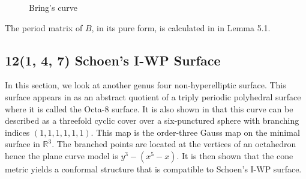 \documentclass[12pt,reqno]{amsart}
\theoremstyle{definition}
\theoremstyle{remark}
\begin{document}
\begin{figure}[htbp]
    \centering
    \qquad
   \qquad
    \caption{Bring's curve}%
    \label{fig:1331}%
\end{figure}



The period matrix of $B$, in its pure form, is calculated in \cite{matti} in Lemma 5.1. %


\subsection{12(1, 4, 7) Schoen's I-WP Surface}


In this section, we look at another genus four non-hyperelliptic surface. This surface appears in \cite{dthesis} as an abstract quotient of a triply periodic polyhedral surface where it is called the Octa-8 surface. It is also shown in \cite{dthesis} that this curve can be described as a threefold cyclic cover over a six-punctured sphere with branching indices $(1, 1, 1, 1, 1, 1).$ This map is the order-three Gauss map on the minimal surface in $\mathbb{R}^3.$ The branched points are located at the vertices of an octahedron hence the plane curve model is $y^3 - (x^5 - x).$ It is then shown that the cone metric yields a conformal structure that is compatible to Schoen's I-WP surface.
\end{document}
